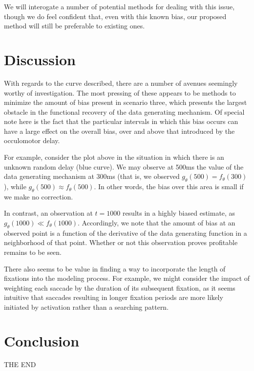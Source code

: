 \documentclass{article}
\begin{document}
We will interogate a number of potential methods for dealing with this issue, though we do feel confident that, even with this known bias, our proposed method will still be preferable to existing ones. 

\section{Discussion}


With regards to the curve described, there are a number of avenues seemingly worthy of investigation. The most pressing of these appears to be methods to minimize the amount of bias present in scenario three, which presents the largest obstacle in the functional recovery of the data generating mechanism. Of special note here is the fact that the particular intervals in which this bias occurs can have a large effect on the overall bias, over and above that introduced by the occulomotor delay. 

For example, consider the plot above in the situation in which there is an unknown random delay (blue curve). We may observe at 500ms the value of the data generating mechanism at 300ms (that is, we observed $g_{\theta}(500) = f_{\theta}(300)$), while $g_{\theta}(500) \approx f_{\theta}(500)$. In other words, the bias over this area is small if we make no correction.

In contrast, an observation at $t = 1000$ results in a highly biased estimate, as $g_{\theta}(1000) \ll f_{\theta}(1000)$. Accordingly, we note that the amount of bias at an observed point is a function of the derivative of the data generating function in a neighborhood of that point. Whether or not this observation proves profitable remains to be seen.

There also seems to be value in finding a way to incorporate the length of fixations into the modeling process. For example, we might consider the impact of weighting each saccade by the duration of its subsequent fixation, as it seems intuitive that saccades resulting in longer fixation periods are more likely initiated by activation rather than a searching pattern.


\section{Conclusion}

THE END
\end{document}
